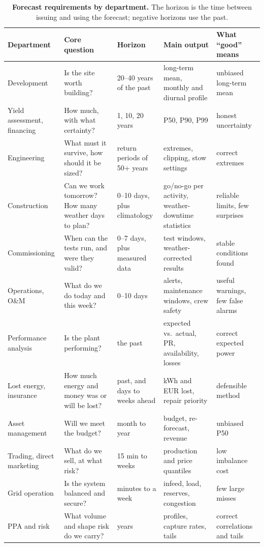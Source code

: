 \begin{table}[t]
\centering\small
\caption{\textbf{Forecast requirements by department.} The horizon is the time between issuing and using the forecast; negative horizons use the past.}
\label{tab:dept}
\setlength{\tabcolsep}{4pt}
\begin{tabularx}{\textwidth}{@{}L{2.75cm}L{3.9cm}L{2.55cm}Y L{2.9cm}@{}}
\toprule
Department & Core question & Horizon & Main output & What ``good'' means \\
\midrule
Development & Is the site worth building? & 20--40 years of the past & long-term mean, monthly and diurnal profile & unbiased long-term mean \\
Yield assessment, financing & How much, with what certainty? & 1, 10, 20 years & P50, P90, P99 & honest uncertainty \\
Engineering & What must it survive, how should it be sized? & return periods of 50+ years & extremes, clipping, stow settings & correct extremes \\
Construction & Can we work tomorrow? How many weather days to plan? & 0--10 days, plus climatology & go/no-go per activity, weather-downtime statistics & reliable limits, few surprises \\
Commissioning & When can the tests run, and were they valid? & 0--7 days, plus measured data & test windows, weather-corrected results & stable conditions found \\
Operations, O\&M & What do we do today and this week? & 0--10 days & alerts, maintenance windows, crew safety & useful warnings, few false alarms \\
Performance analysis & Is the plant performing? & the past & expected vs.\ actual, PR, availability, losses & correct expected power \\
Lost energy, insurance & How much energy and money was or will be lost? & past, and days to weeks ahead & kWh and EUR lost, repair priority & defensible method \\
Asset management & Will we meet the budget? & month to year & budget, re-forecast, revenue & unbiased P50 \\
Trading, direct marketing & What do we sell, at what risk? & 15 min to weeks & production and price quantiles & low imbalance cost \\
Grid operation & Is the system balanced and secure? & minutes to a week & infeed, load, reserves, congestion & few large misses \\
PPA and risk & What volume and shape risk do we carry? & years & profiles, capture rates, tails & correct correlations and tails \\
\bottomrule
\end{tabularx}
\end{table}
